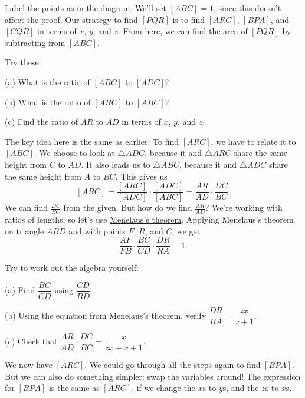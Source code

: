 \documentclass[11pt,paper=letter]{scrartcl}
\begin{document}
Label the points as in the diagram. We'll set $[ABC] = 1$, since this doesn't affect the proof. Our strategy to find $[PQR]$ is to find $[ARC]$, $[BPA]$, and $[CQB]$ in terms of $x$, $y$, and $z$. From here, we can find the area of $[PQR]$ by subtracting from $[ABC]$. 

\begin{exboxed}
  Try these:
  \begin{enumthin}
    \item[(a)] What is the ratio of $[ARC]$ to $[ADC]$? \hint{\ref{h:cv01}}
    \item[(b)] What is the ratio of $[ARC]$ to $[ABC]$? \hint{\ref{h:rt02}}
    \item[(c)] Find the ratio of $AR$ to $AD$ in terms of $x$, $y$, and $z$. \hints{\ref{h:rt03} \ref{h:rt04}}
  \end{enumthin}
\end{exboxed}

The key idea here is the same as earlier.  To find $[ARC]$, we have to relate it to $[ABC]$. We choose to look at $\triangle ADC$, because it and $\triangle ARC$ share the same height from $C$ to $AD$. It also leads us to $\triangle ABC$, because it and $\triangle ADC$ share the same height from $A$ to $BC$. This gives us $$[ARC] = \frac{[ARC]}{[ADC]} \cdot \frac{[ADC]}{[ABC]} = \frac{AR}{AD} \cdot \frac{DC}{BC}.$$ We can find $\frac{DC}{BC}$ from the given. But how do we find $\frac{AR}{AD}$? We're working with ratios of lengths, so let's use \href{https://example.com}{Menelaus's theorem}. Applying Menelaus's theorem on triangle $ABD$ and with points $F$, $R$, and $C$, we get $$\frac{AF}{FB} \cdot \frac{BC}{CD} \cdot \frac{DR}{RA} = 1.$$ 
\begin{exboxed}
  Try to work out the algebra yourself:
  \begin{enumthin}
    \item[(a)] Find $\dfrac{BC}{CD}$ using $\dfrac{CD}{BD}$. \hint{\ref{h:rt05}}
    \item[(b)] Using the equation from Menelaus's theorem, verify $\dfrac{DR}{RA} = \dfrac{zx}{x+1}$.
    \item[(c)] Check that $\dfrac{AR}{AD} \cdot \dfrac{DC}{BC} = \dfrac{x}{zx+x+1}$.
  \end{enumthin}
\end{exboxed}
We now have $[ARC]$. We could go through all the steps again to find $[BPA]$. But we can also do something simpler: swap the variables around! The expression for $[BPA]$ is the same as $[ARC]$, if we change the $x$s to $y$s, and the $z$s to $x$s.
\end{document}
